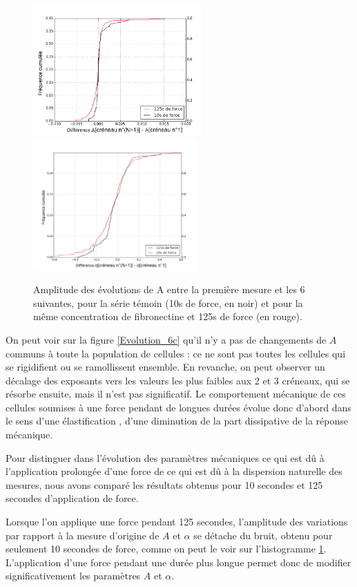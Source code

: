 \documentclass{report}
\begin{document}
\begin{figure}
\includegraphics[height=5cm]{Figures/A_diff_seul.png} 
\includegraphics[height=5cm]{Figures/E_diff_seul.png}
\caption{Amplitude des évolutions de A entre la première mesure et les 6 suivantes, pour la série témoin (10s de force, en noir) et pour la même concentration de fibronectine et 125s de force (en rouge).}
\label{Diff}
\end{figure}

On peut voir sur la figure \ref{Evolution_6c} qu'il n'y a pas de changements de $A$ communs à toute la population de cellules : ce ne sont pas toutes les cellules qui se rigidifient ou se ramollissent ensemble. 
En revanche, on peut observer un décalage des exposants vers les valeurs les plus faibles aux 2\ieme{} et 3\ieme{} créneaux, qui se résorbe ensuite, mais il n'est pas significatif. 
Le comportement mécanique de ces cellules soumises à une force pendant de longues durées évolue donc d'abord dans le sens d'une \og élastification \fg , d'une diminution de la part dissipative de la réponse mécanique. 

Pour distinguer dans l’évolution des paramètres mécaniques ce qui est dû à l’application prolongée d’une force de ce qui est dû à la dispersion naturelle des mesures, nous avons comparé les résultats obtenus pour 10 secondes et 125 secondes d’application de force.

Lorsque l'on applique une force pendant 125 secondes, l'amplitude des variations par rapport à la mesure d'origine de $A$ et $\alpha$ se détache du bruit, obtenu pour seulement 10 secondes de force, comme on peut le voir sur l'histogramme \ref{Diff}. L'application d'une force pendant une durée plus longue permet donc de modifier significativement les paramètres $A$ et $\alpha$. 
\end{document}
